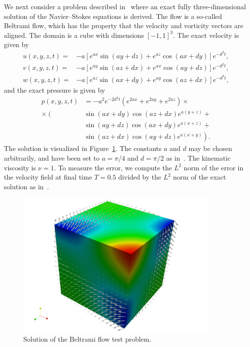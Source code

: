 We next consider a problem described in~\cite{steinmann} where an
exact fully three-dimensional solution of the Navier--Stokes equations
is derived. The flow is a so-called Beltrami flow, which has the
property that the velocity and vorticity vectors are aligned. The
domain is a cube with dimensions $[-1,1]^3$. The exact velocity is
given by
\begin{equation*}
  \begin{split}
    u(x,y,z,t)= & -a [ e^{ax} \sin(ay + dz)  + e^{az} \cos(ax + dy) ] e^{-d^{2}t}, \\
    v(x,y,z,t)= & -a [ e^{ay} \sin(az + dx)  + e^{ax} \cos(ay + dz) ] e^{-d^{2}t}, \\
    w(x,y,z,t)= & -a [ e^{az} \sin(ax + dy)  + e^{ay} \cos(az + dx) ] e^{-d^{2}t},
  \end{split}
\end{equation*}
and the exact pressure is given by
\begin{equation*}
  \begin{split}
    p(x,y,z,t) &= - a^2 e^{-2d^{2}t}
    \left(e^{2ax} + e^{2ay} + e^{2az}\right) \times \\
    \times
    \left( \right.
    &\sin(ax + dy) \cos(az + dx) e^{a(y+z)} + \\
    &\sin(ay + dz) \cos(ax + dy) e^{a(x+z)} + \\
    &\sin(az + dx) \cos(ay + dz) e^{a(x+y)}
    \left. \right).
  \end{split}
\end{equation*}
The solution is visualized in Figure~\ref{fig:beltrami}. The constants
$a$ and $d$ may be chosen arbitrarily, and have been set to $a=\pi/4$
and $d=\pi/2$ as in~\cite{steinmann}. The kinematic viscosity is $\nu
= 1$. To measure the error, we compute the $L^2$ norm of the error in
the velocity field at final time $T = 0.5$ divided by the $L^2$ norm
of the exact solution as in~\cite{steinmann}.

\begin{figure}
  \begin{center}
    \includegraphics[width=10cm]{chapters/kvs-1/pdf/new_beltrami_illustration.pdf}
    \caption{Solution of the Beltrami flow test problem.}
    \label{fig:beltrami}
  \end{center}
\end{figure}

